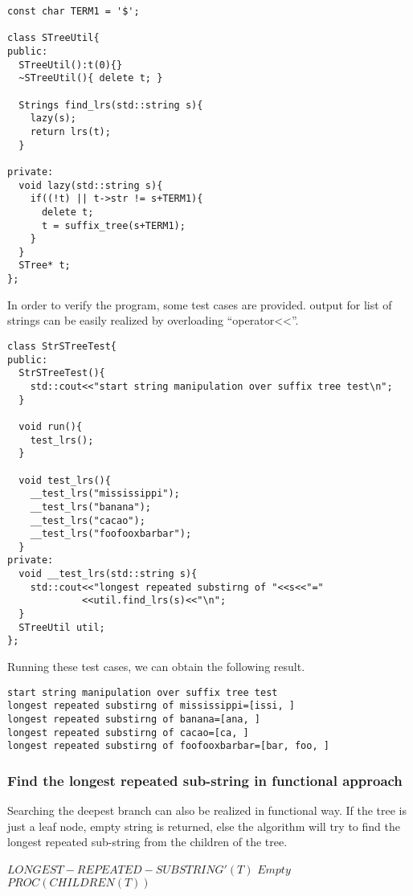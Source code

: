 \documentclass{article}
\begin{document}
\begin{lstlisting}
const char TERM1 = '$';

class STreeUtil{
public:
  STreeUtil():t(0){}
  ~STreeUtil(){ delete t; }

  Strings find_lrs(std::string s){
    lazy(s);
    return lrs(t);
  }

private:
  void lazy(std::string s){
    if((!t) || t->str != s+TERM1){
      delete t;
      t = suffix_tree(s+TERM1);
    }
  }
  STree* t;
};
\end{lstlisting} %

In order to verify the program, some test cases are provided. output
for list of strings can be easily realized by overloading ``operator<<''.

\begin{lstlisting}
class StrSTreeTest{
public:
  StrSTreeTest(){
    std::cout<<"start string manipulation over suffix tree test\n";
  }

  void run(){
    test_lrs();
  }

  void test_lrs(){
    __test_lrs("mississippi");
    __test_lrs("banana");
    __test_lrs("cacao");
    __test_lrs("foofooxbarbar");
  }
private:
  void __test_lrs(std::string s){
    std::cout<<"longest repeated substirng of "<<s<<"="
             <<util.find_lrs(s)<<"\n";
  }
  STreeUtil util;
};
\end{lstlisting}

Running these test cases, we can obtain the following result.
\begin{verbatim}
start string manipulation over suffix tree test
longest repeated substirng of mississippi=[issi, ]
longest repeated substirng of banana=[ana, ]
longest repeated substirng of cacao=[ca, ]
longest repeated substirng of foofooxbarbar=[bar, foo, ]
\end{verbatim}

\subsubsection{Find the longest repeated sub-string in functional approach}
Searching the deepest branch can also be realized in functional way.
If the tree is just a leaf node, empty string is returned, else the
algorithm will try to find the longest repeated sub-string from the 
children of the tree.

\begin{algorithmic}
\STATE $LONGEST-REPEATED-SUBSTRING'(T)$
    \RETURN $Empty$
  \ELSE
    \RETURN $PROC(CHILDREN(T))$
  \ENDIF
\end{algorithmic}
\end{document}
